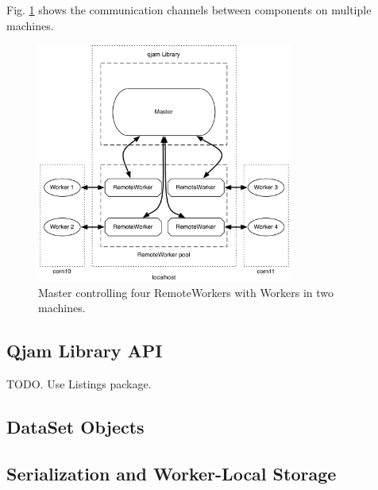 \documentclass[%
  final,
  notitlepage,
  narroweqnarray,
  inline,
]{ieee}
\begin{document}
Fig. \ref{diagram} shows the communication channels between components on
multiple machines.

\begin{figure}[h!]
  \begin{center}
    \includegraphics[width=3.3in]{fwk_diagram/fwk_diagram.pdf}
  \end{center}
  \caption{Master controlling four RemoteWorkers with Workers in two machines.}
  \label{diagram}
\end{figure}

\subsection{Qjam Library API}
\label{Library}


TODO. Use Listings package.

\subsection{DataSet Objects}
\label{DataSet}


\subsection{Serialization and Worker-Local Storage}
\label{Storage}

%
\end{document}
